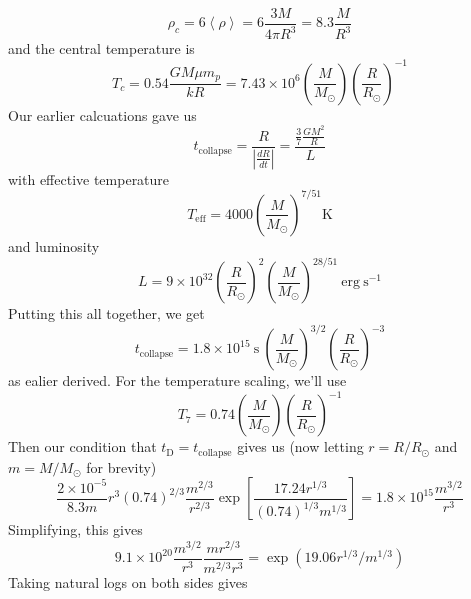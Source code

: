 \documentclass[10pt]{article}
\numberwithin{equation}{section}
\newcommand{\avg}[1]{\left\langle#1\right\rangle}
\newcommand{\abs}[1]{\left\vert#1\right\vert}
\begin{document}
  \begin{equation}
    \label{eq:340}
    \rho_c=6\avg{\rho}=6\frac{3M}{4\pi R^3}=8.3\frac{M}{R^3}
  \end{equation}
  and the central temperature is
  \begin{equation}
    \label{eq:385}
    T_c=0.54\frac{GM\mu m_p}{k R}=7.43\times 10^6\left(\frac{M}{M_\odot}\right)\left(\frac{R}{R_\odot}\right)^{-1}
  \end{equation}
  Our earlier calcuations gave us
  \begin{equation}
    \label{eq:386}
    t_{\mathrm{collapse}}=\frac{R}{\abs{\frac{dR}{dt}}}=\frac{\frac{3}{7}\frac{GM^2}{R}}{L}
  \end{equation}
  with effective temperature
  \begin{equation}
    \label{eq:387}
    T_{\mathrm{eff}}=4000 \left(\frac{M}{M_\odot}\right)^{7/51}\mathrm{K}
  \end{equation}
  and luminosity
  \begin{equation}
    \label{eq:388}
    L=9\times
    10^{32}\left(\frac{R}{R_\odot}\right)^2\left(\frac{M}{M_\odot}\right)^{28/51}\
    \mathrm{erg\ s^{-1}}
  \end{equation}
  Putting this all together, we get
  \begin{equation}
    \label{eq:389}
    \boxed{t_{\mathrm{collapse}}=1.8\times 10^{15}\ \mathrm{s}\
    \left(\frac{M}{M_\odot}\right)^{3/2}\left(\frac{R}{R_\odot}\right)^{-3}}
  \end{equation}
  as ealier derived. For the temperature scaling, we'll use
  \begin{equation}
    \label{eq:390}
    T_7=0.74\left(\frac{M}{M_\odot}\right)\left(\frac{R}{R_\odot}\right)^{-1}
  \end{equation}
  Then our condition that $t_\mathrm{D}=t_{\mathrm{collapse}}$ gives
  us (now letting $r=R/R_\odot$ and $m=M/M_\odot$ for brevity)
  \begin{equation}
    \label{eq:391}
    \frac{2\times 10^{-5}}{8.3
      m}r^3\left(0.74\right)^{2/3}\frac{m^{2/3}}{r^{2/3}}\exp\left[\frac{17.24
        r^{1/3}}{(0.74)^{1/3}m^{1/3}}\right]=1.8\times 10^{15}\frac{m^{3/2}}{r^3}
  \end{equation}
  Simplifying, this gives
  \begin{equation}
    \label{eq:392}
    9.1\times
    10^{20}\frac{m^{3/2}}{r^3}\frac{mr^{2/3}}{m^{2/3}r^3}=\exp\left(19.06 r^{1/3}/m^{1/3}\right)
  \end{equation}
  Taking natural logs on both sides gives
\end{document}
